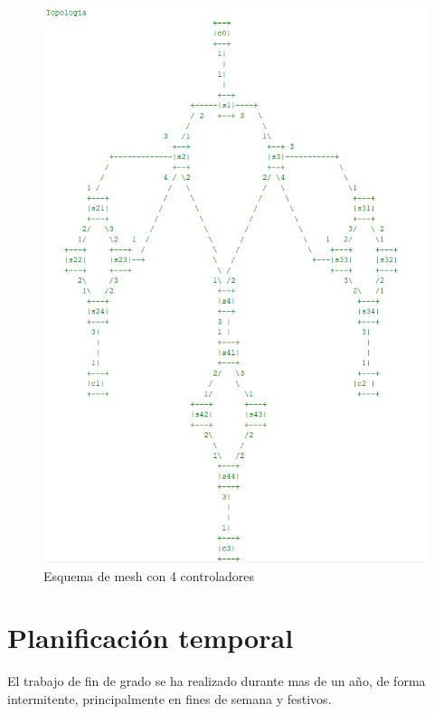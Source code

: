 \documentclass[a4paper, 12pt]{book}
\begin{document}
	\begin{figure}
		\centering
		\includegraphics[width=16cm, keepaspectratio]{img/mesh4c}
		\caption{Esquema de mesh con 4 controladores}
		\label{figura:mesh4c}
	\end{figure}
	
	\section{Planificación temporal}
	\label{sec:planificacion-temporal}
	
	El trabajo de fin de grado se ha realizado durante mas de un año, de forma intermitente, principalmente en fines de semana y festivos. 
	
	
	
\end{document}
